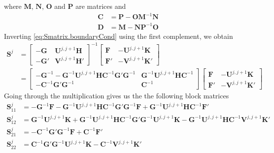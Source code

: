 where $\mathbf{M}$, $\mathbf{N}$, $\mathbf{O}$ and $\mathbf{P}$ are matrices and 
  \begin{align}
    \mathbf{C}	&= \mathbf{P}-\mathbf{OM}^{-1}\mathbf{N}	\\
    \mathbf{D}	&= \mathbf{M}-\mathbf{NP}^{-1}\mathbf{O}
  \end{align}
Inverting \eqref{eq:Smatrix.boundaryCond} using the first complement, we obtain
  \begin{align}
    \mathbf{S}^j 
	&= 
	  \begin{bmatrix}
	    -\mathbf{G}	& \mathbf{U}^{j,j+1}\mathbf{H}	\\
	    -\mathbf{G}'& \mathbf{V}^{j,j+1}\mathbf{H}'
	  \end{bmatrix}^{-1}
	  \begin{bmatrix}
	    \mathbf{F} 	& -\mathbf{U}^{j,j+1}\mathbf{K}	\\
	    \mathbf{F}'	& -\mathbf{V}^{j,j+1}\mathbf{K}'
	  \end{bmatrix}						\\
	&=
	 \begin{bmatrix}
	    -\mathbf{G}^{-1}-\mathbf{G}^{-1}\mathbf{U}^{j,j+1}\mathbf{HC}^{-1}\mathbf{G}'\mathbf{G}^{-1}	& \mathbf{G}^{-1}\mathbf{U}^{j,j+1}\mathbf{HC}^{-1}	\\
	    -\mathbf{C}^{-1}\mathbf{G}'\mathbf{G}^{-1}								& \mathbf{C}^{-1}
	 \end{bmatrix}
	 \begin{bmatrix}
	    \mathbf{F} 	& -\mathbf{U}^{j,j+1}\mathbf{K}	\\
	    \mathbf{F}'	& -\mathbf{V}^{j,j+1}\mathbf{K}'
	  \end{bmatrix}
  \end{align}
Going through the multiplication gives us the the following block matrices
  \begin{subequations}
  \begin{align}
    \mathbf{S}^j_{11}	&= -\mathbf{G}^{-1}\mathbf{F}-\mathbf{G}^{-1}\mathbf{U}^{j,j+1}\mathbf{HC}^{-1}\mathbf{G}'\mathbf{G}^{-1}\mathbf{F}
			    + \mathbf{G}^{-1}\mathbf{U}^{j,j+1}\mathbf{HC}^{-1}\mathbf{F}'							\\
    \mathbf{S}^j_{12}	&= \mathbf{G}^{-1}\mathbf{U}^{j,j+1}\mathbf{K}
			    +\mathbf{G}^{-1}\mathbf{U}^{j,j+1}\mathbf{HC}^{-1}\mathbf{G}'\mathbf{G}^{-1}\mathbf{U}^{j,j+1}\mathbf{K}
			    -\mathbf{G}^{-1}\mathbf{U}^{j,j+1}\mathbf{HC}^{-1}\mathbf{V}^{j,j+1}\mathbf{K}'					\\
    \mathbf{S}^j_{21}	&= -\mathbf{C}^{-1}\mathbf{G}'\mathbf{G}^{-1}\mathbf{F}+\mathbf{C}^{-1}\mathbf{F}'					\\
    \mathbf{S}^j_{22}	&=  \mathbf{C}^{-1}\mathbf{G}'\mathbf{G}^{-1}\mathbf{U}^{j,j+1}\mathbf{K} - \mathbf{C}^{-1}\mathbf{V}^{j,j+1}\mathbf{K}'
  \end{align}
  \end{subequations}
